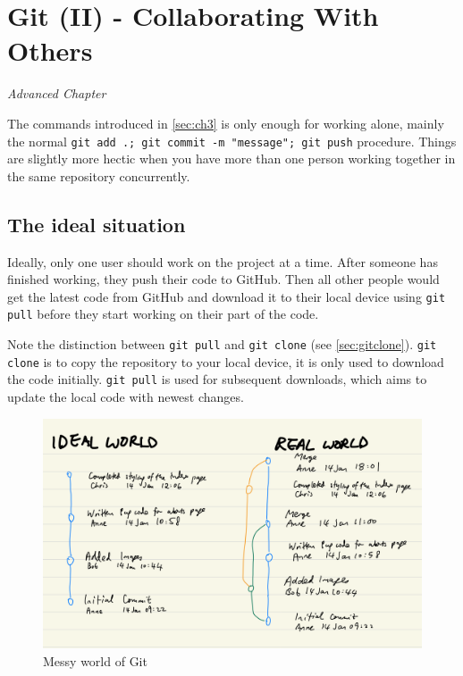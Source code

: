 \chapter{Git (II) - Collaborating With Others}
\label{sec:git2}

\textit{Advanced Chapter}
\vspace{6mm}

The commands introduced in \cref{sec:ch3} is only enough for working alone, mainly the normal \texttt{git add .; git commit -m "message"; git push} procedure. Things are slightly more hectic when you have more than one person working together in the same repository concurrently. 

\section{The ideal situation}

Ideally, only one user should work on the project at a time. After someone has finished working, they push their code to GitHub. Then all other people would get the latest code from GitHub and download it to their local device using \texttt{git pull} before they start working on their part of the code. 

Note the distinction between \texttt{git pull} and \texttt{git clone} (see \cref{sec:gitclone}). \texttt{git clone} is to copy the repository to your local device, it is only used to download the code initially. \texttt{git pull} is used for subsequent downloads, which aims to update the local code with newest changes.

\begin{figure}[h]
\centering
\includegraphics[width=15cm]{images/ch8-messy-git-world.png}
\caption{Messy world of Git}
\end{figure}

